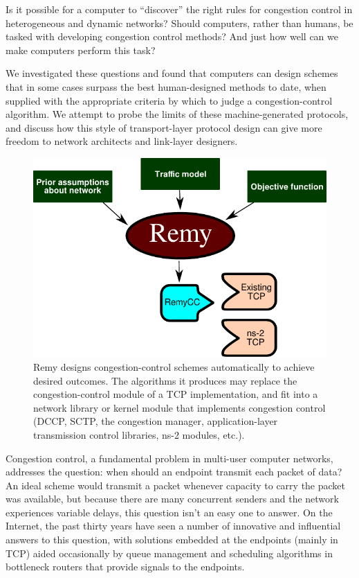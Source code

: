 \label{remy:intro}

Is it possible for a computer to ``discover'' the right rules for
congestion control in heterogeneous and dynamic networks? Should
computers, rather than humans, be tasked with developing congestion
control methods?  And just how well can we make computers perform this
task?

We investigated these questions and found that computers can design
schemes that in some cases surpass the best human-designed methods to
date, when supplied with the appropriate criteria by which to
judge a congestion-control algorithm. We attempt to probe the limits
of these machine-generated protocols, and discuss how this style of
transport-layer protocol design can give more freedom to network
architects and link-layer designers.

\begin{figure}
\vspace{\baselineskip}
\begin{centering}
\includegraphics[width=0.75 \columnwidth]{remy.pdf}
\caption{Remy designs congestion-control schemes automatically to
  achieve desired outcomes. The algorithms it produces may replace
the congestion-control module of a TCP implementation, and fit into
a network library or kernel module that implements congestion
control (DCCP, SCTP, the congestion manager, application-layer
transmission control libraries, ns-2 modules, etc.).}

\end{centering}

\end{figure}

Congestion control, a fundamental problem in multi-user computer
networks, addresses the question: when should an endpoint transmit
each packet of data? An ideal scheme would transmit a packet whenever
capacity to carry the packet was available, but because there are many
concurrent senders and the network experiences variable delays, this
question isn't an easy one to answer. On the Internet, the past thirty
years have seen a number of innovative and influential answers to this
question, with solutions embedded at the endpoints (mainly in TCP)
aided occasionally by queue management and scheduling algorithms in
bottleneck routers that provide signals to the endpoints.

